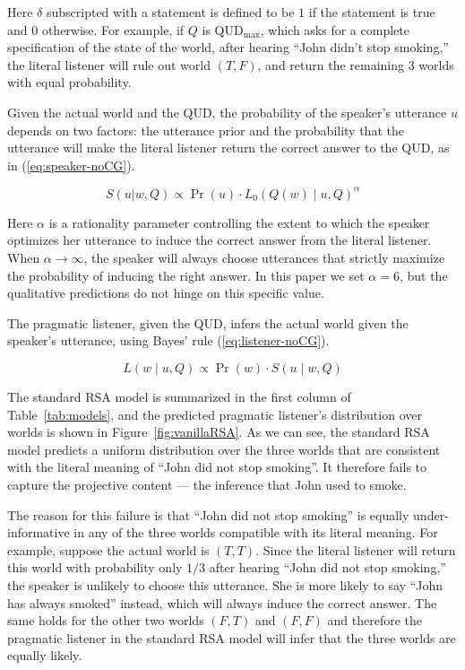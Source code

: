 Here $\delta$ subscripted with a statement is defined to be $1$ if the statement 
 is true and $0$ otherwise.
For example, if $Q$ is QUD$_\textrm{max}$, which asks for a complete specification of the state of the world, after hearing ``John didn't stop smoking,'' the literal listener will rule out world $(T, F)$, and return the remaining 3 worlds with equal probability.


Given the actual world and the QUD, the probability of 
 the speaker's utterance $u$ depends on two factors: the utterance prior 
 and the probability that the utterance will make the literal listener 
 return the correct answer to the QUD, as in (\ref{eq:speaker-noCG}).

\vspace{-6pt} 
\begin{equation}
S(u | w, Q) \propto \Pr(u) \cdot L_0(Q(w) \mid u, Q)^\alpha 
\label{eq:speaker-noCG}
\end{equation}

Here $\alpha$ is a rationality parameter controlling the extent to which 
 the speaker optimizes her utterance to induce the correct answer from the 
 literal listener. 
When $\alpha \rightarrow \infty$, the speaker will always choose utterances that 
 strictly maximize the probability of inducing the right answer.
In this paper we set $\alpha=6$, but the qualitative predictions do not hinge on 
 this specific value.

The pragmatic listener, given the QUD, infers the actual world given the speaker's utterance, using Bayes' rule (\ref{eq:listener-noCG}).

\vspace{-6pt} 
\begin{equation}
L(w \mid u, Q) \propto \Pr(w) \cdot S(u \mid w, Q) \label{eq:listener-noCG}
\end{equation}

The standard RSA model is summarized in the first column of Table~\ref{tab:models},
 and the predicted pragmatic listener's distribution over worlds is shown in Figure~\ref{fig:vanillaRSA}.
As we can see, the standard RSA model predicts a uniform distribution over the
 three worlds that are consistent with the literal meaning of 
 ``John did not stop smoking''. It therefore fails to capture the projective content --- the inference that  
 John used to smoke.

The reason for this failure is that ``John did not stop smoking'' is equally
 under-informative in any of the three worlds compatible with its literal meaning.
For example, suppose the actual world is $(T, T)$. Since the 
 literal listener will return this world with probability only $1/3$ after hearing ``John did not stop smoking,'' the speaker is unlikely to choose this utterance.
She is more likely to say ``John has always smoked'' instead, which will always
 induce the correct answer. 
The same holds for the other two worlds $(F, T)$ and $(F,
 F)$ and therefore the pragmatic listener in the standard RSA model will 
 infer that the three worlds are equally likely.
 
